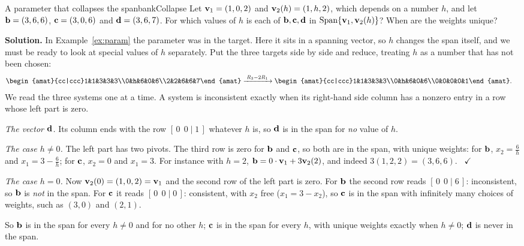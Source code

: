 \documentclass[11pt]{article}
\begin{document}
\begin{exmp}{A parameter that collapses the span}{bankCollapse}
Let $\mathbf{v}_1=(1,0,2)$ and $\mathbf{v}_2(h)=(1,h,2)$, which depends on a number $h$, and let $\mathbf{b}=(3,6,6)$, $\mathbf{c}=(3,0,6)$ and $\mathbf{d}=(3,6,7)$. For which values of $h$ is each of $\mathbf{b},\mathbf{c},\mathbf{d}$ in $\operatorname{Span}\{\mathbf{v}_1,\mathbf{v}_2(h)\}$? When are the weights unique?

\textbf{Solution.} In Example~\ref{ex:param} the parameter was in the target. Here it sits in a spanning vector, so $h$ changes the span itself, and we must be ready to look at special values of $h$ separately. Put the three targets side by side and reduce, treating $h$ as a number that has not been chosen:
\begin{align*}
\begin{amat}{cc|ccc}1&1&3&3&3\\0&h&6&0&6\\2&2&6&6&7\end{amat}
&\rops{R_3-2R_1}
\begin{amat}{cc|ccc}1&1&3&3&3\\0&h&6&0&6\\0&0&0&0&1\end{amat}.
\end{align*}
We read the three systems one at a time. A system is inconsistent exactly when its right-hand side column has a nonzero entry in a row whose left part is zero.

\emph{The vector $\mathbf{d}$.} Its column ends with the row $[\,0\ \ 0\mid1\,]$ whatever $h$ is, so $\mathbf{d}$ is in the span for \emph{no} value of $h$.

\emph{The case $h\neq0$.} The left part has two pivots. The third row is zero for $\mathbf{b}$ and $\mathbf{c}$, so both are in the span, with unique weights: for $\mathbf{b}$, $x_2=\tfrac6h$ and $x_1=3-\tfrac6h$; for $\mathbf{c}$, $x_2=0$ and $x_1=3$. For instance with $h=2$, $\mathbf{b}=0\cdot\mathbf{v}_1+3\mathbf{v}_2(2)$, and indeed $3(1,2,2)=(3,6,6)$. \ $\checkmark$

\emph{The case $h=0$.} Now $\mathbf{v}_2(0)=(1,0,2)=\mathbf{v}_1$ and the second row of the left part is zero. For $\mathbf{b}$ the second row reads $[\,0\ \ 0\mid6\,]$: inconsistent, so $\mathbf{b}$ is \emph{not} in the span. For $\mathbf{c}$ it reads $[\,0\ \ 0\mid0\,]$: consistent, with $x_2$ free ($x_1=3-x_2$), so $\mathbf{c}$ is in the span with infinitely many choices of weights, such as $(3,0)$ and $(2,1)$.

So $\mathbf{b}$ is in the span for every $h\neq0$ and for no other $h$; $\mathbf{c}$ is in the span for every $h$, with unique weights exactly when $h\neq0$; $\mathbf{d}$ is never in the span.


\end{exmp}
\end{document}
